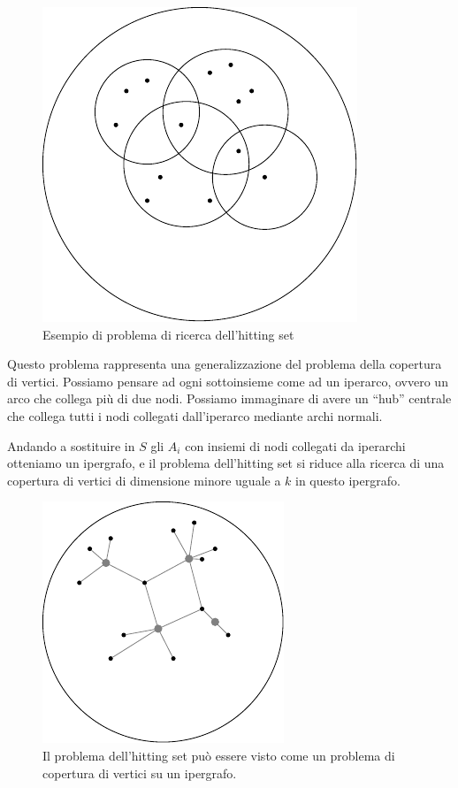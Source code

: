 \begin{figure}[h]
    \begin{center}
        \includegraphics{./img/NPClass/HIT.pdf}
        \caption{Esempio di problema di ricerca dell'hitting set}
    \end{center}
\end{figure}

Questo problema rappresenta una generalizzazione del problema della copertura di vertici. Possiamo
pensare ad ogni sottoinsieme come ad un iperarco, ovvero un arco che collega più di due nodi.
Possiamo immaginare di avere un ``hub'' centrale che collega tutti i nodi collegati dall'iperarco
mediante archi normali.

Andando a sostituire in $S$ gli $A_{i}$ con insiemi di nodi collegati da iperarchi otteniamo un
ipergrafo, e il problema dell'hitting set si riduce alla ricerca di una copertura di vertici di
dimensione minore uguale a $k$ in questo ipergrafo.

\begin{figure}[h]
    \begin{center}
        \includegraphics{./img/NPClass/HYPERGRAPH.pdf}
        \caption{Il problema dell'hitting set può essere visto come un problema di copertura di
        vertici su un ipergrafo.}
    \end{center}
\end{figure}

